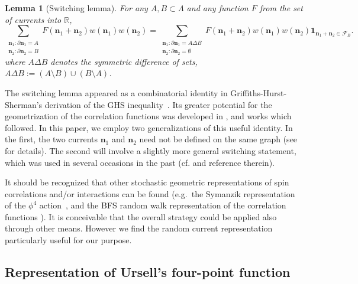 \documentclass[a4paper,oneside,11pt]{article}
\newtheorem{lemma}[theorem]{Lemma}
\numberwithin{equation}{section}
\numberwithin{equation}{section}
\numberwithin{equation}{section}
\newcommand{\calF}{\mathcal{F}}
\newcommand{\bbR}{\mathbb{R}}
\newcommand{\n}{\mathbf{n}}
\begin{document}
\begin{lemma}[Switching lemma]\label{lem:switching} For any $A,B\subset \Lambda$ and any function $F$ from the set of currents into $\bbR$, 
\begin{equation}\sum_{\substack{
\n_1:\partial\n_1=A\\
\n_2:\partial\n_2=B}}F(\n_1+\n_2)w(\n_1)w(\n_2)=\sum_{\substack{
\n_1:\partial\n_1=A\Delta B\\
\n_2:\partial\n_2=\emptyset}}F(\n_1+\n_2)w(\n_1)w(\n_2)\bm 1_{{\n_1+\n_2}\in \calF_B}.
\end{equation}
where $A\Delta B $ denotes the symmetric difference of sets, $A\Delta B:=(A\setminus B)\cup(B\setminus A)$. 
\end{lemma}  

The switching lemma appeared as a combinatorial identity in Griffiths-Hurst-Sherman's derivation of the GHS inequality~\cite{GHS70}.  Its greater potential  for the geometrization of the correlation functions was developed in \cite{Aiz82}, and works which followed. In this paper, we employ two generalizations of this useful identity.  In the first,  the two currents $\n_1$ and $\n_2$ need not be defined on the same graph (see \cite[Lemma~2.2]{AizDumSid15} for details).  The second 
 will involve a slightly more general switching statement, which was used in several occasions in the past (cf.  \cite[Lemma 2.1]{AizDumTasWar18}  and reference therein).
 
It should be recognized that other stochastic geometric representations of spin correlations and/or interactions can be found (e.g.~the Symanzik representation of the $\phi^4$ action~\cite{Sym69}, and the BFS random walk representation of the correlation functions \cite{BryFroSpe82}).  It is conceivable that the overall strategy could be applied also through other means.   However we find the random current representation particularly useful for our purpose.  


\subsection{Representation of Ursell's four-point function}
\end{document}
